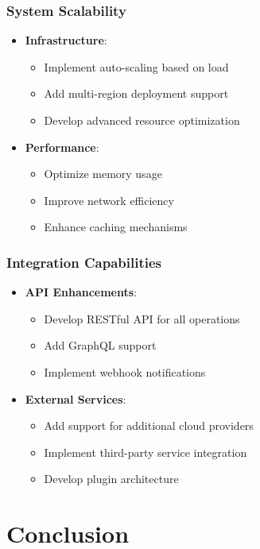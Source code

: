 \documentclass[12pt,a4paper]{report}
\begin{document}
\subsection{System Scalability}
\begin{itemize}
\item \textbf{Infrastructure}:
    \begin{itemize}
        \item Implement auto-scaling based on load
        \item Add multi-region deployment support
        \item Develop advanced resource optimization
    \end{itemize}
\item \textbf{Performance}:
    \begin{itemize}
        \item Optimize memory usage
        \item Improve network efficiency
        \item Enhance caching mechanisms
    \end{itemize}
\end{itemize}

\subsection{Integration Capabilities}
\begin{itemize}
\item \textbf{API Enhancements}:
    \begin{itemize}
        \item Develop RESTful API for all operations
        \item Add GraphQL support
        \item Implement webhook notifications
    \end{itemize}
\item \textbf{External Services}:
    \begin{itemize}
        \item Add support for additional cloud providers
        \item Implement third-party service integration
        \item Develop plugin architecture
    \end{itemize}
\end{itemize}



\chapter{Conclusion}
\end{document}
